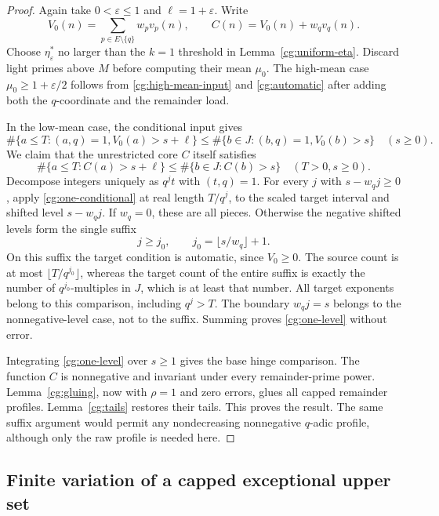 \begin{proof}
Again take $0<\varepsilon\le1$ and $\ell=1+\varepsilon$.
Write
\[
 V_0(n)=\sum_{p\in E\setminus\{q\}}w_pv_p(n),\qquad
 C(n)=V_0(n)+w_qv_q(n).
\]
Choose $\eta_\varepsilon^*$ no larger than the $k=1$ threshold
in Lemma~\ref{cg:uniform-eta}. Discard light primes above $M$
before computing their mean $\mu_0$.
The high-mean case $\mu_0\ge1+\varepsilon/2$ follows from
\eqref{cg:high-mean-input} and \eqref{cg:automatic} after adding
both the $q$-coordinate and the remainder load.

In the low-mean case, the conditional input gives
\begin{equation}
 \#\{a\le T:(a,q)=1, V_0(a)>s+\ell\}
 \le\#\{b\in J:(b,q)=1, V_0(b)>s\}
 \quad(s\ge0).
 \label{cg:one-conditional}
\end{equation}
We claim that the unrestricted core $C$ itself satisfies
\begin{equation}
 \#\{a\le T:C(a)>s+\ell\}
 \le\#\{b\in J:C(b)>s\}
 \quad(T>0, s\ge0).
 \label{cg:one-level}
\end{equation}
Decompose integers uniquely as $q^jt$ with $(t,q)=1$.
For every $j$ with $s-w_qj\ge0$, apply
\eqref{cg:one-conditional} at real length $T/q^j$, to the scaled
target interval and shifted level $s-w_qj$.
If $w_q=0$, these are all pieces. Otherwise the negative shifted
levels form the single suffix
\[
 j\ge j_0,\qquad j_0=\lfloor s/w_q\rfloor+1.
\]
On this suffix the target condition is automatic, since $V_0\ge0$.
The source count is at most $\lfloor T/q^{j_0}\rfloor$, whereas
the target count of the entire suffix is exactly the number of
$q^{j_0}$-multiples in $J$, which is at least that number.
All target exponents belong to this comparison, including $q^j>T$.
The boundary $w_qj=s$ belongs to the nonnegative-level case, not
to the suffix. Summing proves \eqref{cg:one-level} without error.

Integrating \eqref{cg:one-level} over $s\ge1$ gives the base
hinge comparison. The function $C$ is nonnegative and invariant
under every remainder-prime power. Lemma~\ref{cg:gluing}, now
with $\rho=1$ and zero errors, glues all capped remainder profiles.
Lemma~\ref{cg:tails} restores their tails. This proves the result.
The same suffix argument would permit any nondecreasing nonnegative
$q$-adic profile, although only the raw profile is needed here.
\end{proof}

\subsection{Finite variation of a capped exceptional upper set}

